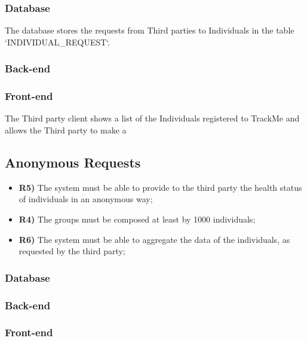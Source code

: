\subsubsection*{Database}
The database stores the requests from Third parties to Individuals in the table `INDIVIDUAL_REQUEST`.

\subsubsection*{Back-end}


\subsubsection*{Front-end}

The Third party client shows a list of the Individuals registered to TrackMe and allows the Third party to make a 

\subsection{Anonymous Requests}	
\begin{itemize}	
	\item {\color{Green}\textbf{R5)}} The system must be able to provide to the third party the health status of individuals
in an anonymous way;
	\item {\color{Green}\textbf{R4)}} The groups must be composed at least by 1000 individuals;
	\item {\color{Green}\textbf{R6)}} The system must be able to aggregate the data of the individuals, as requested by the
third party;
\end{itemize}	
\subsubsection*{Database}


\subsubsection*{Back-end}


\subsubsection*{Front-end}